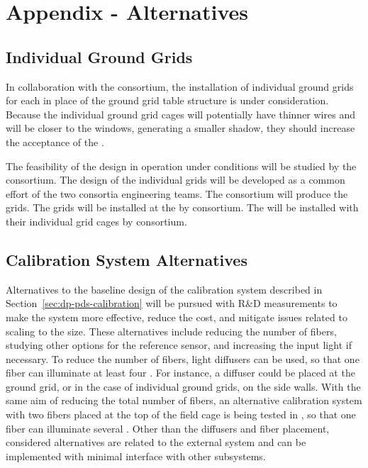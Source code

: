\section{Appendix - Alternatives}
\label{sec:dp-pds-appendix}

\subsection{Individual Ground Grids}
\label{sec:dp-pds-appendix-grid}

In collaboration with the  consortium, the installation of individual ground grids for each  in place of the ground grid table structure is under consideration. Because the individual ground grid cages will potentially have thinner wires and will be closer to the  windows, generating a smaller shadow, they should increase the acceptance of the .

The feasibility of the design in operation under \dune \dual conditions will be studied by the  consortium. The design of the individual grids will be developed as a common effort of the two consortia engineering teams. The  consortium will produce the grids. The grids will be installed at the  by \dual {} consortium. The  will be installed with their individual grid cages by \dual {} consortium. 

\subsection{Calibration System Alternatives}
\label{sec:dp-pds-appendix-calibration}

Alternatives to the baseline design of the calibration system described in Section~\ref{sec:dp-pds-calibration} will be pursued with R\&D measurements to make the system more effective, reduce the cost, and mitigate issues related to scaling to the \dune \dual size. These alternatives include reducing the number of fibers, studying other options for the reference sensor, and increasing the input light if necessary. To reduce the number of fibers, light diffusers can be used, so that one fiber can illuminate at least four . For instance, a diffuser could be placed at the ground grid, or in the case of individual ground grids, on the side walls. With the same aim of reducing the total number of fibers, an alternative calibration system with two fibers placed at the top of the field cage is being tested in , so that one fiber can illuminate several . Other than the diffusers and fiber placement, considered alternatives are related to the external system and can be implemented with minimal interface with other subsystems.

